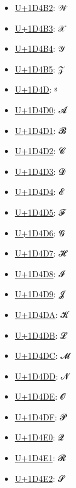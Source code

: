 \begin{itemize}
	\item \href{https://www.compart.com/en/unicode/U+1D4B2}{U+1D4B2}: 𝒲
	\item \href{https://www.compart.com/en/unicode/U+1D4B3}{U+1D4B3}: 𝒳
	\item \href{https://www.compart.com/en/unicode/U+1D4B4}{U+1D4B4}: 𝒴
	\item \href{https://www.compart.com/en/unicode/U+1D4B5}{U+1D4B5}: 𝒵
	\item \href{https://www.compart.com/en/unicode/U+1D4D}{U+1D4D}: ᵍ
	\item \href{https://www.compart.com/en/unicode/U+1D4D0}{U+1D4D0}: 𝓐
	\item \href{https://www.compart.com/en/unicode/U+1D4D1}{U+1D4D1}: 𝓑
	\item \href{https://www.compart.com/en/unicode/U+1D4D2}{U+1D4D2}: 𝓒
	\item \href{https://www.compart.com/en/unicode/U+1D4D3}{U+1D4D3}: 𝓓
	\item \href{https://www.compart.com/en/unicode/U+1D4D4}{U+1D4D4}: 𝓔
	\item \href{https://www.compart.com/en/unicode/U+1D4D5}{U+1D4D5}: 𝓕
	\item \href{https://www.compart.com/en/unicode/U+1D4D6}{U+1D4D6}: 𝓖
	\item \href{https://www.compart.com/en/unicode/U+1D4D7}{U+1D4D7}: 𝓗
	\item \href{https://www.compart.com/en/unicode/U+1D4D8}{U+1D4D8}: 𝓘
	\item \href{https://www.compart.com/en/unicode/U+1D4D9}{U+1D4D9}: 𝓙
	\item \href{https://www.compart.com/en/unicode/U+1D4DA}{U+1D4DA}: 𝓚
	\item \href{https://www.compart.com/en/unicode/U+1D4DB}{U+1D4DB}: 𝓛
	\item \href{https://www.compart.com/en/unicode/U+1D4DC}{U+1D4DC}: 𝓜
	\item \href{https://www.compart.com/en/unicode/U+1D4DD}{U+1D4DD}: 𝓝
	\item \href{https://www.compart.com/en/unicode/U+1D4DE}{U+1D4DE}: 𝓞
	\item \href{https://www.compart.com/en/unicode/U+1D4DF}{U+1D4DF}: 𝓟
	\item \href{https://www.compart.com/en/unicode/U+1D4E0}{U+1D4E0}: 𝓠
	\item \href{https://www.compart.com/en/unicode/U+1D4E1}{U+1D4E1}: 𝓡
	\item \href{https://www.compart.com/en/unicode/U+1D4E2}{U+1D4E2}: 𝓢

\end{itemize}
